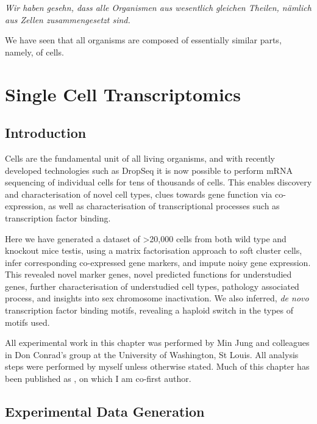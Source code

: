 \begin{savequote}[8cm]
	\textit{Wir haben gesehn, dass alle Organismen aus wesentlich gleichen Theilen, nämlich aus Zellen zusammengesetzt sind.}
	
	We have seen that all organisms are composed of essentially similar parts, namely, of cells.
\end{savequote}

\chapter{\label{ch:2-SDA} Single Cell Transcriptomics}

\minitoc

\section{Introduction}
Cells are the fundamental unit of all living organisms, and with recently developed technologies such as DropSeq it is now possible to perform mRNA sequencing of individual cells for tens of thousands of cells.
This enables discovery and characterisation of novel cell types, clues towards gene function via co-expression, as well as characterisation of transcriptional processes such as transcription factor binding.

Here we have generated a dataset of >20,000 cells from both wild type and knockout mice testis, using a matrix factorisation approach to soft cluster cells, infer corresponding co-expressed gene markers, and impute noisy gene expression.
This revealed novel marker genes, novel predicted functions for understudied genes, further characterisation of understudied cell types, pathology associated process, and insights into sex chromosome inactivation.
We also inferred, \emph{de novo} transcription factor binding motifs, revealing a haploid switch in the types of motifs used.

\vspace{0.7cm}
\begin{framed}
\noindent All experimental work in this chapter was performed by Min Jung and colleagues in Don Conrad's group at the University of Washington, St Louis.
All analysis steps were performed by myself unless otherwise stated.
Much of this chapter has been published as \cite{Jung2019Unified}, on which I am co-first author.
\end{framed}

\section{Experimental Data Generation}

